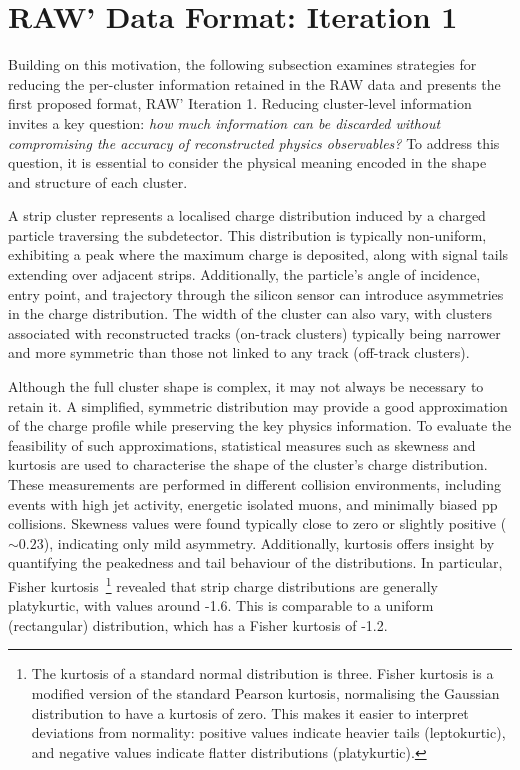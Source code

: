 \section{RAW' Data Format: Iteration 1}
\label{Section:Chapter5-RAW'_Iteration_1}
Building on this motivation, the following subsection examines strategies for reducing the per-cluster information retained in the RAW data and presents the first proposed format, RAW' Iteration 1. Reducing cluster-level information invites a key question: \textit{how much information can be discarded without compromising the accuracy of reconstructed physics observables?} To address this question, it is essential to consider the physical meaning encoded in the shape and structure of each cluster. 

A strip cluster represents a localised charge distribution induced by a charged particle traversing the subdetector. This distribution is typically non-uniform, exhibiting a peak where the maximum charge is deposited, along with signal tails extending over adjacent strips. Additionally, the particle's angle of incidence, entry point, and trajectory through the silicon sensor can introduce asymmetries in the charge distribution. The width of the cluster can also vary, with clusters associated with reconstructed tracks (on-track clusters) typically being narrower and more symmetric than those not linked to any track (off-track clusters).

Although the full cluster shape is complex, it may not always be necessary to retain it. A simplified, symmetric distribution may provide a good approximation of the charge profile while preserving the key physics information. To evaluate the feasibility of such approximations, statistical measures such as skewness and kurtosis are used to characterise the shape of the cluster's charge distribution. These measurements are performed in different collision environments, including events with high jet activity, energetic isolated muons, and minimally biased pp collisions. Skewness values were found typically close to zero or slightly positive ($\sim 0.23$), indicating only mild asymmetry. Additionally, kurtosis offers insight by quantifying the peakedness and tail behaviour of the distributions. In particular, Fisher kurtosis~\cite{Kurtosis}\footnote{The kurtosis of a standard normal distribution is three. Fisher kurtosis is a modified version of the standard Pearson kurtosis, normalising the Gaussian distribution to have a kurtosis of zero. This makes it easier to interpret deviations from normality: positive values indicate heavier tails (leptokurtic), and negative values indicate flatter distributions (platykurtic).} revealed that strip charge distributions are generally platykurtic, with values around -1.6. This is comparable to a uniform (rectangular) distribution, which has a Fisher kurtosis of -1.2.

